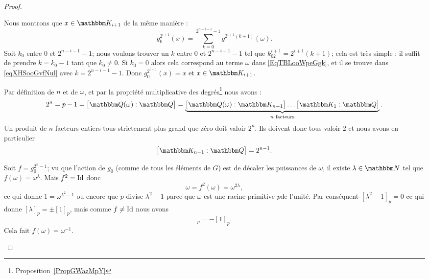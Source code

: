 \begin{proof}
\begin{subproof}
\begin{subproof}
                        Nous montrons que \( x\in \eK_{i+1}\) de la même manière :
                        \begin{equation}    \label{eqXHSooGvfNul}
                            g_0^{2^{i+1}}(x)=\sum_{k=0}^{2^{n-i-1}-1}g^{2^{i+1}(k+1)}(\omega).
                        \end{equation}
                        Soit \( k_0\) entre \( 0\) et \( 2^{n-i-1}-1\); nous voulons trouver un \( k\) entre \( 0\) et \( 2^{n-i-1}-1\) tel que \( k_02^{i+1}=2^{i+1}(k+1)\); cela est très simple : il suffit de prendre \( k=k_0-1\) tant que \( k_0\neq 0\). Si \( k_0=0\) alors cela correspond au terme \( \omega\) dans \eqref{EqTBLooWpeGgk}, et il se trouve dans \eqref{eqXHSooGvfNul} avec \( k=2^{n-i-1}-1\). Donc \( g_0^{2^{i+1}}(x)=x\) et \( x\in \eK_{i+1}\).
                    \item[Les degrés dans la tour]
                        Par définition de \( n\) et de \( \omega\), et par la propriété multiplicative des degrés\footnote{Proposition~\ref{PropGWazMpY}} nous avons :
                        \begin{equation}
                            2^n=p-1=\big[ \eQ(\omega):\eQ \big]=\underbrace{\big[ \eQ(\omega):\eK_{n-1} \big]\ldots\big[ \eK_1:\eQ \big]}_{ n\text{ facteurs}}.
                        \end{equation}
                        Un produit de \( n\) facteurs entiers tous strictement plus grand que zéro doit valoir \( 2^n\). Ils doivent donc tous valoir \( 2\) et nous avons en particulier
                        \begin{equation}
                            \big[ \eK_{n-1}:\eQ \big]=2^{n-1}.
                        \end{equation}
                    \item[\( \cos(2\pi/p)\in \eK_{n-1}\)]
                        Soit \( f=g_0^{2^n-1}\); vu que l'action de \( g_0\) (comme de tous les éléments de \( G\)) est de décaler les puissances de \( \omega\), il existe \( \lambda\in \eN\) tel que \( f(\omega)=\omega^{\lambda}\). Mais \( f^2=\operatorname{Id}\) donc
                        \begin{equation}
                            \omega=f^2(\omega)=\omega^{2\lambda},
                        \end{equation}
                        ce qui donne \( 1=\omega^{\lambda^2-1}\) ou encore que \( p\) divise \( \lambda^2-1\) parce que \( \omega\) est une racine primitive \( p\)\ieme de l'unité. Par conséquent \( [\lambda^2-1]_p=0\) ce qui donne \( [\lambda]_p=\pm[1]_p\), mais comme \( f\neq \operatorname{Id}\) nous avons
                        \begin{equation}
                            [\lambda]_p=-[1]_p.
                        \end{equation}
                        Cela fait \( f(\omega)=\omega^{-1}\).


\end{subproof}
\end{subproof}
\end{proof}
